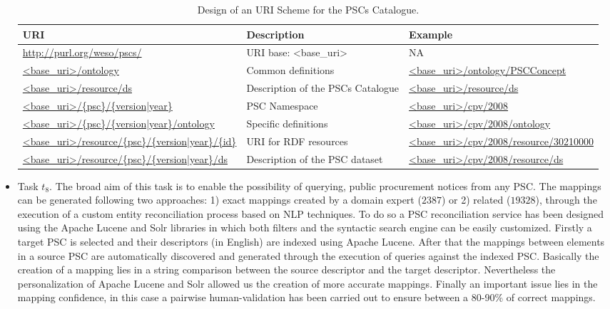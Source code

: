 \begin{itemize}
 \begin{table}[!ht]
\renewcommand{\arraystretch}{1.3}
\begin{center}
\begin{tabular}[c]{|p{5cm}|p{4.5cm}|p{5cm}|} 
\hline
  \textbf{URI} &  \textbf{Description} & \textbf{Example} \\\hline
  \url{http://purl.org/weso/pscs/} & URI base: <base\_uri> & NA \\ \hline
  \url{<base_uri>/ontology} & Common definitions & \url{<base_uri>/ontology/PSCConcept} \\ \hline
  \url{<base_uri>/resource/ds} & Description of the PSCs Catalogue & \url{<base_uri>/resource/ds} \\ \hline
  \url{<base_uri>/{psc}/{version|year}} & PSC Namespace & \url{<base_uri>/cpv/2008} \\ \hline
  \url{<base_uri>/{psc}/{version|year}/ontology} & Specific definitions & \url{<base_uri>/cpv/2008/ontology} \\ \hline
  \url{<base_uri>/resource/{psc}/{version|year}/{id}} & URI for RDF resources & \url{<base_uri>/cpv/2008/resource/30210000} \\ \hline
  \url{<base_uri>/resource/{psc}/{version|year}/ds} & Description of the PSC dataset  & \url{<base_uri>/cpv/2008/resource/ds} \\ \hline
\hline
\end{tabular}
\caption{Design of an URI Scheme for the PSCs Catalogue.}\label{table:pscs-uri}
  \end{center}
\end{table} 

\item Task $t_8$. The broad aim of this task is to enable the possibility of querying, 
public procurement notices from any PSC. The mappings can be generated following two approaches: 
1) exact mappings created by a domain expert ($2387$) or 2) related ($19328$), through the execution of a custom entity reconciliation process 
based on NLP techniques. To do so a PSC reconciliation service has been designed using the Apache Lucene and Solr libraries in which
both filters and the syntactic search engine can be easily customized. Firstly a target PSC is selected and their descriptors (in English) 
are indexed using Apache Lucene. After that the mappings between elements in a source PSC are automatically discovered and generated through the execution 
of queries against the indexed PSC. Basically the creation of a mapping lies in a string comparison between the source descriptor and the 
target descriptor. Nevertheless the personalization of Apache Lucene and Solr allowed us the creation of more accurate mappings. Finally 
an important issue lies in the mapping confidence, in this case a pairwise human-validation has been carried out to ensure between a 80-90\% of 
correct mappings.


\end{itemize}
